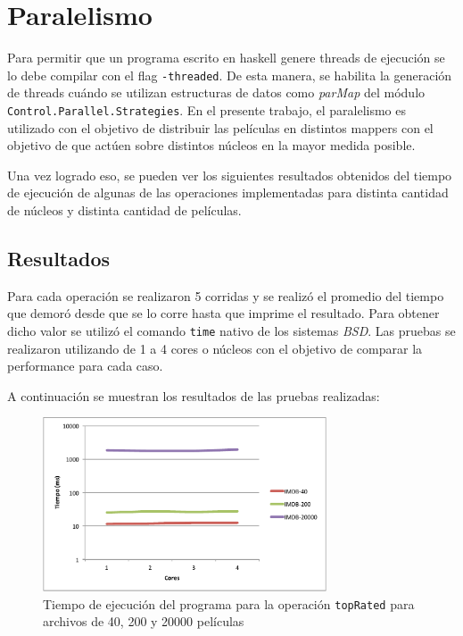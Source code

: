 \documentclass[a4paper,11pt]{article}
\begin{document}
\section{Paralelismo}

Para permitir que un programa escrito en haskell genere threads de ejecución se lo debe compilar con el flag \texttt{-threaded}. De esta manera, se habilita la generación de threads cuándo se utilizan estructuras de datos como \textit{parMap} del módulo \texttt{Control.Parallel.Strategies}. En el presente trabajo, el paralelismo es utilizado con el objetivo de distribuir las películas en distintos mappers con el objetivo de que actúen sobre distintos núcleos en la mayor medida posible.

Una vez logrado eso, se pueden ver los siguientes resultados obtenidos del tiempo de ejecución de algunas de las operaciones implementadas para distinta cantidad de núcleos y distinta cantidad de películas.


\subsection{Resultados}

Para cada operación se realizaron 5 corridas y se realizó el promedio del tiempo que demoró desde que se lo corre hasta que imprime el resultado.
Para obtener dicho valor se utilizó el comando \texttt{time} nativo de los sistemas \textit{BSD}. Las pruebas se realizaron utilizando de 1 a 4 cores o núcleos con el objetivo de comparar la performance para cada caso.

A continuación se muestran los resultados de las pruebas realizadas:

\begin{figure}[H]
    \centering
    \includegraphics[width=0.75\textwidth]{images/topRated.pdf}
    \caption{Tiempo de ejecución del programa para la operación \texttt{topRated} para archivos de 40, 200 y 20000 películas}
    \label{fig:topRated}
\end{figure}
\end{document}
